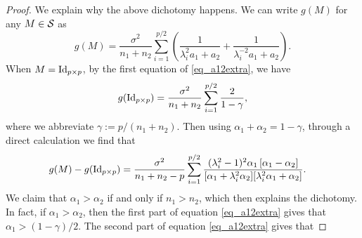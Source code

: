 \begin{proof}
    We explain why the above dichotomy happens. We can write $g(M)$ for any $M \in \mathcal{S}$ as
    $$g(M)=\frac{\sigma^2}{ n_1+n_2 }\sum_{i=1}^{p/2}\left( \frac{1}{\lambda_i^{2} a_1 + a_2} + \frac1{\lambda_i^{-2} a_1 + a_2} \right).$$
    When $M=\operatorname{Id}_{p\times p}$, by the first equation of \eqref{eq_a12extra}, we have
    $$g(\operatorname{Id}_{p\times p})=\frac{\sigma^2}{ n_1+n_2 }\sum_{i=1}^{p/2} \frac{2}{1-\gamma},$$
    where we abbreviate $\gamma:=p/(n_1+n_2)$. Then using $\alpha_1 + \alpha_2 = 1-\gamma$, through a direct calculation we find that
    \begin{align*}
        g(M) - g(\id_{p\times p})%
        &= \frac{\sigma^2 }{ n_1+n_2-p} \sum_{i=1}^{p/2} \frac{(\lambda_i^2-1)^2 \alpha_1 \left[ \alpha_1 - \alpha_2\right] }{[\alpha_1 + \lambda_i^2 \alpha_2][\lambda_i^2 \alpha_1 + \alpha_2]} .
    \end{align*}
    We claim that $\alpha_1 > \alpha_2$ if and only if $n_1 > n_2$, which then explains the dichotomy.
    In fact, if $\alpha_1 > \alpha_2$, then the first part of equation \eqref{eq_a12extra} gives that $\alpha_1 > (1-\gamma)/2$.
    The second part of equation \eqref{eq_a12extra} gives that

\end{proof}
